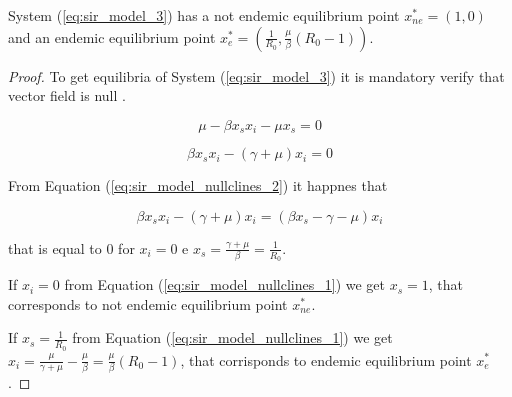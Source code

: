 \begin{theorem}
\label{th:sir_equilibria}
System (\ref{eq:sir_model_3}) has a not endemic equilibrium point $x_{ne}^* = (1,0)$ and an endemic equilibrium point $x_e^*=(\frac{1}{R_0}, \frac{\mu}{\beta} (R_0 - 1))$.
\end{theorem}

\begin{proof}
To get equilibria of System (\ref{eq:sir_model_3}) it is mandatory verify that vector field is null \cite[p. 3]{bib:khalil}.

\begin{equation}
\label{eq:sir_model_nullclines_1}
         \mu - \beta x_sx_i - \mu x_s = 0
\end{equation}

\begin{equation}
\label{eq:sir_model_nullclines_2}
         \beta x_sx_i - (\gamma + \mu)x_i = 0
\end{equation}

From Equation (\ref{eq:sir_model_nullclines_2}) it happnes that

\begin{equation}
\label{eq:sir_model_nullclines_2_demonstation}
         \beta x_sx_i - (\gamma + \mu)x_i = (\beta x_s -\gamma - \mu)x_i
\end{equation}

that is equal to 0 for $x_i = 0$ e $x_s = \frac{\gamma + \mu}{\beta}=\frac{1}{R_0}$.

If $x_i = 0$ from Equation (\ref{eq:sir_model_nullclines_1}) we get $x_s = 1$, that corresponds to not endemic equilibrium point $x_{ne}^*$.

If $x_s = \frac{1}{R_0}$ from Equation (\ref{eq:sir_model_nullclines_1}) we get $x_i=\frac{\mu}{\gamma + \mu} - \frac{\mu}{\beta} = \frac{\mu}{\beta} (R_0 - 1)$, that corrisponds to endemic equilibrium point $x_e^*$.
\end{proof}